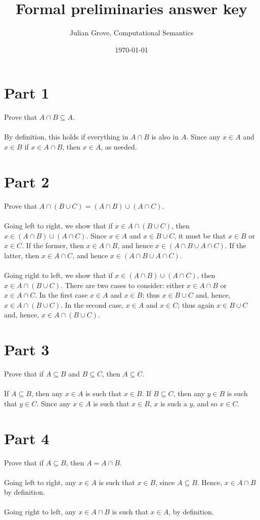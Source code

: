 \documentclass[11pt,letterpaper,twoside]{article}
\author{Julian Grove, Computational Semantics}
\date{\today}
\title{Formal preliminaries answer key}
\theoremstyle{definition}
\begin{document}
\maketitle

\section{Part 1}
\label{sec:orgc7867df}
Prove that \(A ∩ B ⊆ A\). \\
~\\
By definition, this holds if everything in \(A ∩ B\) is also in \(A\). Since any
\(x ∈ A\) and \(x ∈ B\) if \(x ∈ A ∩ B\), then \(x ∈ A\), as needed.

\section{Part 2}
\label{sec:org8b775d4}
Prove that \(A ∩ (B ∪ C) = (A ∩ B) ∪ (A ∩ C)\). \\
~\\
\noindent Going left to right, we show that if \(x ∈ A ∩ (B ∪ C)\),
then \(x ∈ (A ∩ B) ∪ (A ∩ C)\). Since \(x ∈ A\) and \(x ∈ B ∪ C\), it must be that
\(x ∈ B\) or \(x ∈ C\). If the former, then \(x ∈ A ∩ B\), and hence \(x ∈ (A ∩ B ∪ A
  ∩ C)\). If the latter, then \(x ∈ A ∩ C\), and hence \(x ∈ (A ∩ B ∪ A ∩ C)\). \\
~\\
\noindent Going right to left, we show that if \(x ∈ (A ∩ B) ∪ (A ∩
  C)\), then \(x ∈ A ∩ (B ∪ C)\). There are two cases to consider: either \(x ∈ A ∩
  B\) or \(x ∈ A ∩ C\). In the first case \(x ∈ A\) and \(x ∈ B\); thus \(x ∈ B ∪ C\)
and, hence, \(x ∈ A ∩ (B ∪ C)\). In the second case, \(x ∈ A\) and \(x ∈ C\); thus
again \(x ∈ B ∪ C\) and, hence, \(x ∈ A ∩ (B ∪ C)\).

\section{Part 3}
\label{sec:orge23b032}
Prove that if \(A ⊆ B\) and \(B ⊆ C\), then \(A ⊆ C\). \\
~\\
\noindent If \(A ⊆ B\), then any \(x ∈ A\) is such that \(x ∈ B\). If \(B ⊆
  C\), then any \(y ∈ B\) is such that \(y ∈ C\). Since any \(x ∈ A\) is such that \(x ∈
  B\), \(x\) is such a \(y\), and so \(x ∈ C\).

\section{Part 4}
\label{sec:org6f4d898}
Prove that if \(A ⊆ B\), then \(A = A ∩ B\). \\
~\\
\noindent Going left to right, any \(x ∈ A\) is such that \(x ∈ B\),
since \(A ⊆ B\). Hence, \(x ∈ A ∩ B\) by definition. \\
~\\
\noindent Going right to left, any \(x ∈ A ∩ B\) is such that \(x ∈ A\),
by definition.
\end{document}
